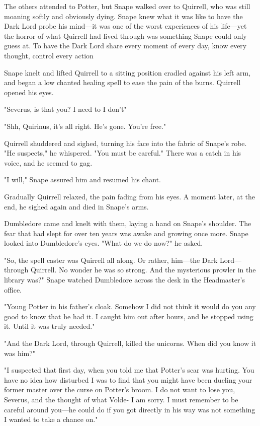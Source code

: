 The others attended to Potter, but Snape walked over to Quirrell, who was still moaning softly and obviously dying. Snape knew what it was like to have the Dark Lord probe his mind—it was one of the worst experiences of his life—yet the horror of what Quirrell had lived through was something Snape could only guess at. To have the Dark Lord share every moment of every day, know every thought, control every action{\el}

Snape knelt and lifted Quirrell to a sitting position cradled against his left arm, and began a low chanted healing spell to ease the pain of the burns. Quirrell opened his eyes.

"Severus, is that you? I need to{\el} I don't{\el}"

"Shh, Quirinus, it's all right. He's gone. You're free."

Quirrell shuddered and sighed, turning his face into the fabric of Snape's robe. "He suspects," he whispered. "You must be careful." There was a catch in his voice, and he seemed to gag.

"I will," Snape assured him and resumed his chant.

Gradually Quirrell relaxed, the pain fading from his eyes. A moment later, at the end, he sighed again and died in Snape's arms.

Dumbledore came and knelt with them, laying a hand on Snape's shoulder. The fear that had slept for over ten years was awake and growing once more. Snape looked into Dumbledore's eyes. "What do we do now?" he asked.

\sbreak

"So, the spell caster was Quirrell all along. Or rather, him—the Dark Lord—through Quirrell. No wonder he was so strong. And the mysterious prowler in the library was{\el}?" Snape watched Dumbledore across the desk in the Headmaster's office.

"Young Potter in his father's cloak. Somehow I did not think it would do you any good to know that he had it. I caught him out after hours, and he stopped using it. Until it was truly needed."

"And the Dark Lord, through Quirrell, killed the unicorns. When did you know it was him?"

"I suspected that first day, when you told me that Potter's scar was hurting. You have no idea how disturbed I was to find that you might have been dueling your former master over the curse on Potter's broom. I do not want to lose you, Severus, and the thought of what Volde-{\el} I am sorry. I must remember to be careful around you{\el}—he could do if you got directly in his way was not something I wanted to take a chance on."

